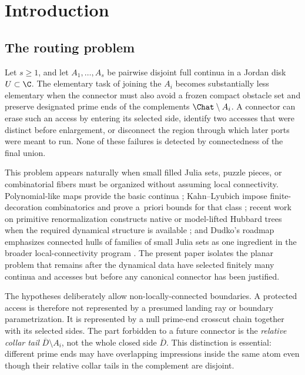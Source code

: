 
\section{Introduction}\label{sec:intro}

\subsection{The routing problem}

Let $s\ge1$, and let $A_1,\dots,A_s$ be pairwise disjoint full continua in a Jordan disk
$U\subset\C$.  The elementary task of joining the $A_i$ becomes substantially
less elementary when the connector must also avoid a frozen compact obstacle
set and preserve designated prime ends of the complements
$\Chat\setminus A_i$.  A connector can erase such an access by entering its
selected side, identify two accesses that were distinct before enlargement,
or disconnect the region through which later ports were meant to run.
None of these failures is detected by connectedness of the final union.

This problem appears naturally when small filled Julia sets, puzzle pieces,
or combinatorial fibers must be organized without assuming local
connectivity.  Polynomial-like maps provide the basic continua
\cite{DH85}; Kahn--Lyubich impose finite-decoration combinatorics and
prove a~priori bounds for that class \cite{KL08}; recent work on
primitive renormalization constructs native or model-lifted Hubbard trees
when the required dynamical structure is available \cite{KKL26}; and
Dudko's roadmap emphasizes connected hulls of families of small Julia sets
as one ingredient in the broader local-connectivity program \cite{Dud25}.
The present paper isolates the planar problem that remains after the
dynamical data have selected finitely many continua and accesses but before
any canonical connector has been justified.

The hypotheses deliberately allow non-locally-connected boundaries.
A protected access is therefore not represented by a presumed landing ray
or boundary parametrization.  It is represented by a null prime-end
crosscut chain together with its selected sides.  The part forbidden to a
future connector is the \emph{relative collar tail}
$\overline D\setminus A_i$, not the whole closed side $\overline D$.
This distinction is essential: different prime ends may have overlapping
impressions inside the same atom even though their relative collar tails in
the complement are disjoint.

